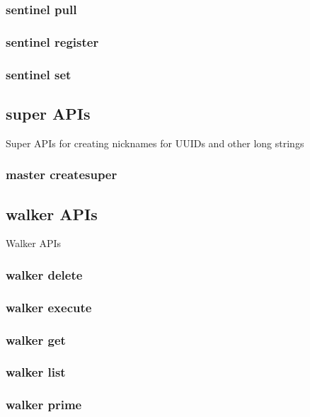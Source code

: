 \subsubsection{sentinel pull}

\subsubsection{sentinel register}

\subsubsection{sentinel set}

\subsection{super APIs}

Super APIs for creating nicknames for UUIDs and other long strings
\par


\subsubsection{master createsuper}

\subsection{walker APIs}

Walker APIs

\subsubsection{walker delete}

\subsubsection{walker execute}

\subsubsection{walker get}

\subsubsection{walker list}

\subsubsection{walker prime}

